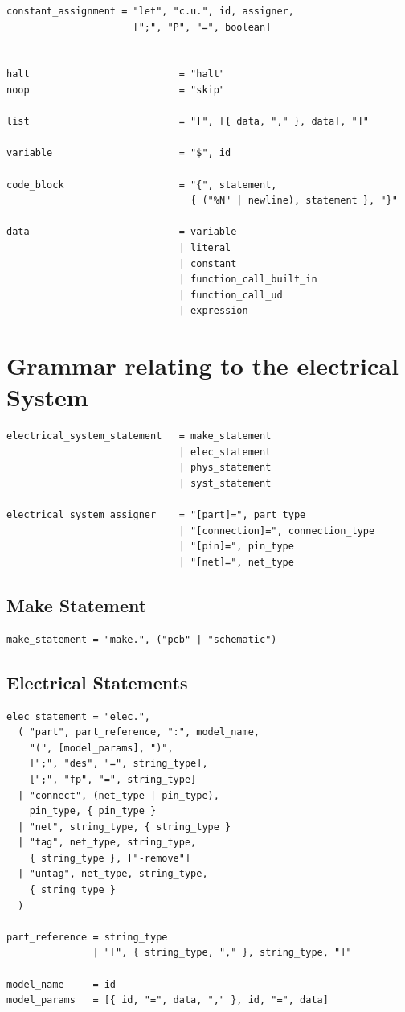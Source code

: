 \documentclass{report}
\begin{document}
\begin{verbatim}
constant_assignment = "let", "c.u.", id, assigner, 
                      [";", "P", "=", boolean]


halt                          = "halt"
noop                          = "skip"

list                          = "[", [{ data, "," }, data], "]"

variable                      = "$", id

code_block                    = "{", statement, 
                                { ("%N" | newline), statement }, "}"

data                          = variable
                              | literal
                              | constant
                              | function_call_built_in
                              | function_call_ud
                              | expression
\end{verbatim}

\newpage
\section{Grammar relating to the electrical System}
\begin{verbatim}
electrical_system_statement   = make_statement
                              | elec_statement
                              | phys_statement
                              | syst_statement

electrical_system_assigner    = "[part]=", part_type
                              | "[connection]=", connection_type
                              | "[pin]=", pin_type
                              | "[net]=", net_type
\end{verbatim}

\subsection{Make Statement}
\begin{verbatim}
make_statement = "make.", ("pcb" | "schematic")
\end{verbatim}

\subsection{Electrical Statements}
\begin{verbatim}
elec_statement = "elec.",
  ( "part", part_reference, ":", model_name,
    "(", [model_params], ")",
    [";", "des", "=", string_type],
    [";", "fp", "=", string_type]
  | "connect", (net_type | pin_type),
    pin_type, { pin_type }
  | "net", string_type, { string_type }
  | "tag", net_type, string_type,
    { string_type }, ["-remove"]
  | "untag", net_type, string_type,
    { string_type }
  )

part_reference = string_type
               | "[", { string_type, "," }, string_type, "]"

model_name     = id
model_params   = [{ id, "=", data, "," }, id, "=", data]
\end{verbatim}
\end{document}
